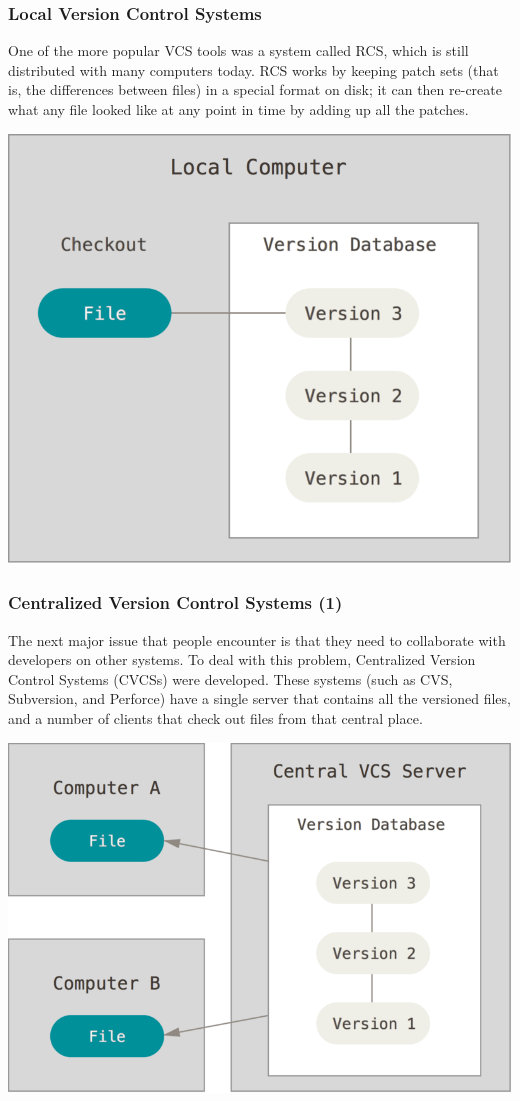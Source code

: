 \begin{frame}
  \frametitle{Local Version Control Systems}
  One of the more popular VCS tools was a system called RCS, which is still distributed with many computers today. RCS works by keeping patch sets (that is, the differences between files) in a special format on disk; it can then re-create what any file looked like at any point in time by adding up all the patches.
  \vspace{1em}
  \begin{center}
    \includegraphics[width=0.5\linewidth]{figures/local}
  \end{center}
\end{frame}


\begin{frame}
  \frametitle{Centralized Version Control Systems (1)}
  The next major issue that people encounter is that they need to collaborate with developers on other systems. To deal with this problem, Centralized Version Control Systems (CVCSs) were developed. These systems (such as CVS, Subversion, and Perforce) have a single server that contains all the versioned files, and a number of clients that check out files from that central place. 
  \vspace{1em}
  \begin{center}
    \includegraphics[width=0.5\linewidth]{figures/centralized}
  \end{center}
\end{frame}

